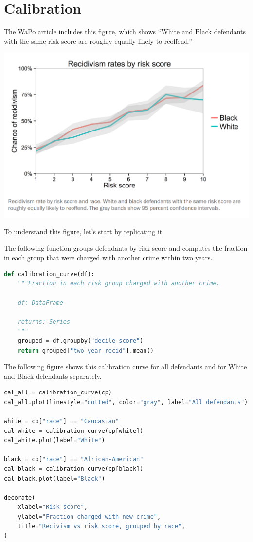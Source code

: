 \hypertarget{calibration}{%
\section{Calibration}\label{calibration}}

The WaPo article includes this figure, which shows ``White and Black
defendants with the same risk score are roughly equally likely to
reoffend.''

\includegraphics{chapters/figs/calibration1.png}

To understand this figure, let's start by replicating it.

The following function groups defendants by risk score and computes the
fraction in each group that were charged with another crime within two
years.

\begin{lstlisting}[language=Python,style=source]
def calibration_curve(df):
    """Fraction in each risk group charged with another crime.

    df: DataFrame

    returns: Series
    """
    grouped = df.groupby("decile_score")
    return grouped["two_year_recid"].mean()
\end{lstlisting}

The following figure shows this calibration curve for all defendants and
for White and Black defendants separately.

\begin{lstlisting}[language=Python,style=source]
cal_all = calibration_curve(cp)
cal_all.plot(linestyle="dotted", color="gray", label="All defendants")

white = cp["race"] == "Caucasian"
cal_white = calibration_curve(cp[white])
cal_white.plot(label="White")

black = cp["race"] == "African-American"
cal_black = calibration_curve(cp[black])
cal_black.plot(label="Black")

decorate(
    xlabel="Risk score",
    ylabel="Fraction charged with new crime",
    title="Recivism vs risk score, grouped by race",
)
\end{lstlisting}

